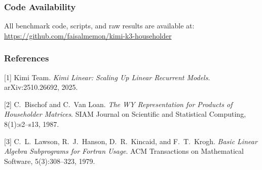 \documentclass{article} %
\begin{document}
\subsubsection*{Code Availability}

All benchmark code, scripts, and raw results are available at:\\
\url{https://github.com/faisalmemon/kimi-k3-householder}

\subsubsection*{References}

\small{
[1] Kimi Team.
\textit{Kimi Linear: Scaling Up Linear Recurrent Models}.
arXiv:2510.26692, 2025.

[2] C.~Bischof and C.~Van Loan.
\textit{The WY Representation for Products of Householder Matrices}.
SIAM Journal on Scientific and Statistical Computing, 8(1):s2--s13, 1987.

[3] C.~L.~Lawson, R.~J.~Hanson, D.~R.~Kincaid, and F.~T.~Krogh.
\textit{Basic Linear Algebra Subprograms for Fortran Usage}.
ACM Transactions on Mathematical Software, 5(3):308--323, 1979.
}
\end{document}
